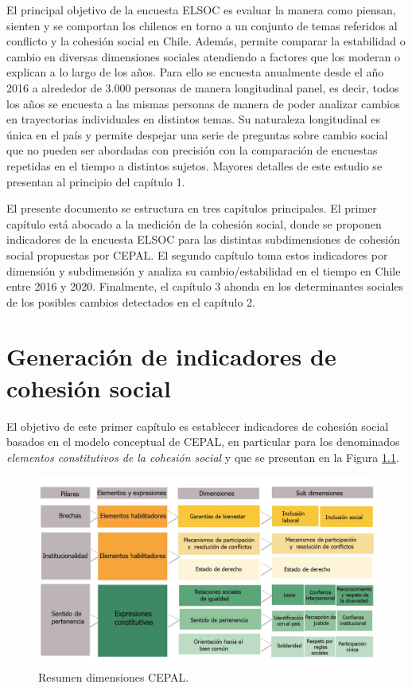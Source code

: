 \documentclass[
  12pt,
]{book}
\begin{document}
El principal objetivo de la encuesta ELSOC es evaluar la manera como piensan, sienten y se comportan los chilenos en torno a un conjunto de temas referidos al conflicto y la cohesión social en Chile. Además, permite comparar la estabilidad o cambio en diversas dimensiones sociales atendiendo a factores que los moderan o explican a lo largo de los años. Para ello se encuesta anualmente desde el año 2016 a alrededor de 3.000 personas de manera longitudinal panel, es decir, todos los años se encuesta a las mismas personas de manera de poder analizar cambios en trayectorias individuales en distintos temas. Su naturaleza longitudinal es única en el país y permite despejar una serie de preguntas sobre cambio social que no pueden ser abordadas con precisión con la comparación de encuestas repetidas en el tiempo a distintos sujetos. Mayores detalles de este estudio se presentan al principio del capítulo 1.

El presente documento se estructura en tres capítulos principales. El primer capítulo está abocado a la medición de la cohesión social, donde se proponen indicadores de la encuesta ELSOC para las distintas subdimensiones de cohesión social propuestas por CEPAL. El segundo capítulo toma estos indicadores por dimensión y subdimensión y analiza su cambio/estabilidad en el tiempo en Chile entre 2016 y 2020. Finalmente, el capítulo 3 ahonda en los determinantes sociales de los posibles cambios detectados en el capítulo 2.

\hypertarget{generaciuxf3n-de-indicadores-de-cohesiuxf3n-social}{%
\chapter{Generación de indicadores de cohesión social}\label{generaciuxf3n-de-indicadores-de-cohesiuxf3n-social}}

El objetivo de este primer capítulo es establecer indicadores de cohesión social basados en el modelo conceptual de CEPAL, en particular para los denominados \emph{elementos constitutivos de la cohesión social} y que se presentan en la Figura \ref{fig:esquema-cepal}.

\begin{figure}[H]

{\centering \includegraphics[width=1\linewidth,height=1\textheight]{images/dimensiones-cepal} 

}

\caption{Resumen dimensiones CEPAL.}\label{fig:esquema-cepal}
\end{figure}
\end{document}
